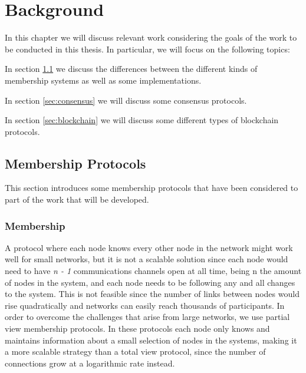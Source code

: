 
%

\chapter{Background}
\label{cha:Background}

In this chapter we will discuss relevant work considering the goals of the work
to be conducted in this thesis. In particular, we will focus on the following topics:

In section \ref{sec:membership_protocols} we discuss the differences between
the different kinds of membership systems as well as some implementations.

In section \ref{sec:consensus} we will discuss some consensus protocols.

In section \ref{sec:blockchain} we will discuss some different types of
blockchain protocols.

\section{Membership Protocols}
\label{sec:membership_protocols}

This section introduces some membership protocols that have been considered to
part of the work that will be developed.


\subsection{Membership}
\label{sub:membership}

A protocol where each node knows every other node in the network might work well
for small networks, but it is not a scalable solution since each node would need
to have \textit{n - 1} communications channels open at all time, being n the
amount of nodes in the system, and each node needs to be following any and all
changes to the system. This is not feasible since the number of links between
nodes would rise quadratically and networks can easily reach thousands of
participants. In order to overcome the challenges that arise from large networks,
we use partial view membership protocols. In these protocols each node only knows
and maintains information about a small selection of nodes in the systems,
making it a more scalable strategy than a total view protocol, since
the number of connections grow at a logarithmic rate instead.

